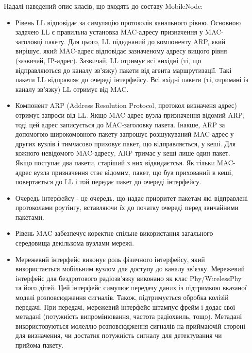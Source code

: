 \documentclass[a4paper,ukrainian,utf8,nocolumnsxix,floatsection,equationsection]{eskdtext}
\begin{document}
Надалі наведений опис класів, що входять до составу MobileNode:

\begin{itemize}
	\item Рівень LL відповідає за симуляцію протоколів канального рівню. Основною задачею LL є правильна установка MAC-адресу призначення у MAC-заголовці пакету. Для цього, LL підєднаний до компоненту ARP, який вирішує, який MAC-адрес відповідає зазначеному адресу вищого рівня (зазвичай, IP-адрес). Зазвичай, LL отримує всі вихідні (ті, що відправляються до каналу зв’язку) пакети від агента маршрутизації. Такі пакети LL відправляє до очереді інтерфейсу. Всі вхідні пакети (ті, отримані із каналу зв’язку) LL отримує від MAC.

	\item Компонент ARP (Address Resolution Protocol, протокол визначеня адрес) отримує запроси від LL. Якщо MAC-адрес вузла призначення відомий ARP, тоді цей адрес записується до MAC-заголовку пакета. Інакше, ARP за допомогою широкомовного пакету запрошує розшукуваний MAC-адрес у других вузлів і тимчасово приховує пакет, що відправляється, у кеші. Для кожного невідомого MAC-адресу, ARP тримає у кеші лише один пакет. Якщо поступає два пакети, старіший з них відкидаєтсья. Як тільки MAC-адрес вузла призначення стає відомим, пакет, що був прихований в кеші, повертається до LL і той передає пакет до очереді інтерфейсу.

	\item Очередь інтерфейсу - це очередь, що надає приоритет пакетам які відправлені протоколами роутінгу, вставляючи їх до початку очереді перед звичайними пакетами.

	\item Рівень MAC забезпечує коректне спільне використання загального середовища декількома вузлами мережі. 

	\item Мережевий інтерфейс виконує роль фізичного інтерфейсу, який використається мобільним вузлом для доступу до каналу зв’язку. Мережевий інтерфейс для бездротового радіозв’язку виконано як клас Phy/WirelessPhy та його дітей. Цей інтерфейс симулює передачу даних із підтримкою вказаної моделі розповсюдження сигналів. Також, підтримується обробка колізій передачі. При передачі, мережевий інтерфейс штампує фрейм і додає свої метадані (потужність випромінювання, частота радіохвиль, тощо). Метадані використовуються молеллю розповсюдження сигналів на приймаючій стороні для визначення, чи достатня потужність сигналу для детектування чи прийома пакету.


\end{itemize}
\end{document}
